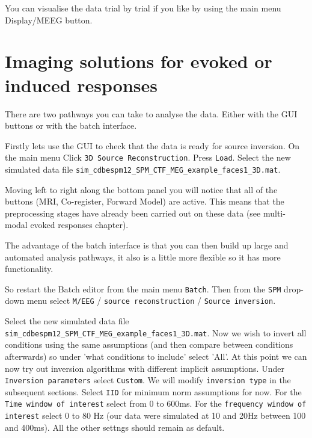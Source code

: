 You can visualise the data trial by trial if you like by using the main menu Display/MEEG button.
\section{Imaging solutions for evoked or induced responses}

There are two pathways you can take to analyse the data. Either with the GUI buttons or with the batch interface. 

Firstly lets use the GUI to check that the data is ready for source inversion. On the main menu Click \texttt{3D Source Reconstruction}. Press \texttt{Load}. Select the new simulated data file \texttt{sim\_cdbespm12\_SPM\_CTF\_MEG\_example\_faces1\_3D.mat}.

Moving left to right along the bottom panel you will notice that all of the buttons (MRI, Co-register, Forward Model) are active. This means that the preprocessing stages have already been carried out on these data (see multi-modal evoked responses chapter).

 The advantage of the batch interface is that you can then build up large and automated analysis pathways, it also is a little more flexible so it has more functionality.

So restart the Batch editor from the main menu \texttt{Batch}. Then from the \texttt{SPM} drop-down menu select \texttt{M/EEG} / \texttt{source reconstruction} / \texttt{Source inversion}.

Select the new simulated data file \texttt{sim\_cdbespm12\_SPM\_CTF\_MEG\_example\_faces1\_3D.mat}.
Now we wish to invert all conditions using the same assumptions (and then compare between conditions afterwards) so under 'what conditions to include' select 'All'.
At this point we can now try out inversion algorithms with different implicit assumptions. Under \texttt{Inversion parameters} select \texttt{Custom}.
We will modify \texttt{inversion type} in the subsequent sections. Select \texttt{IID} for minimum norm assumptions for now.
For the \texttt{Time window of interest} select from 0 to 600ms. For the \texttt{frequency window of interest} select 0 to 80 Hz  (our data were simulated at 10 and 20Hz between 100 and 400ms).
All the other settngs should remain as default.

